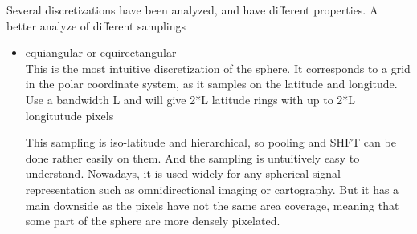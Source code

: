 \documentclass[11pt]{report}
\begin{document}
Several discretizations have been analyzed, and have different properties.
A better analyze of different samplings \cite{elahi_comparative_2016}
\begin{itemize}
    \item equiangular or equirectangular\\ %
    This is the most intuitive discretization of the sphere. It corresponds to a grid in the polar coordinate system, as it samples on the latitude and longitude.
    Use a bandwidth L and will give 2*L latitude rings with up to 2*L longitutude pixels
    
    This sampling is iso-latitude and hierarchical, so pooling and SHFT can be done rather easily on them. And the sampling is untuitively easy to understand. Nowadays, it is used widely for any spherical signal representation such as omnidirectional imaging or cartography. But it has a main downside as the pixels have not the same area coverage, meaning that some part of the sphere are more densely pixelated.
    

\end{itemize}
\end{document}

